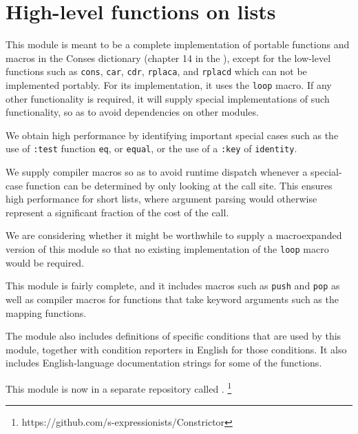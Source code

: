 \chapter{High-level functions on lists}

This module is meant to be a complete implementation of portable
functions and macros in the Conses dictionary (chapter 14 in the
\hs{}), except for the low-level functions such as \texttt{cons},
\texttt{car}, \texttt{cdr}, \texttt{rplaca}, and \texttt{rplacd} which
can not be implemented portably.  For its implementation, it uses the
\texttt{loop} macro.  If any other functionality is required, it will
supply special implementations of such functionality, so as to avoid
dependencies on other modules.

We obtain high performance by identifying important special
cases such as the use of \texttt{:test} function \texttt{eq}, or
\texttt{equal}, or the use of a \texttt{:key} of \texttt{identity}.

We supply compiler macros so as to avoid runtime dispatch whenever a
special-case function can be determined by only looking at the call
site.  This ensures high performance for short lists, where argument
parsing would otherwise represent a significant fraction of the cost
of the call.

We are considering whether it might be worthwhile to supply a
macroexpanded version of this module so that no existing
implementation of the \texttt{loop} macro would be required. 

This module is fairly complete, and it includes macros such as
\texttt{push} and \texttt{pop} as well as compiler macros for
functions that take keyword arguments such as the mapping functions. 

The module also includes definitions of specific conditions that are
used by this module, together with condition reporters in English for
those conditions.  It also includes English-language documentation
strings for some of the functions. 

This module is now in a separate repository called \constrictor{}.%
\footnote{https://github.com/s-expressionists/Constrictor}
